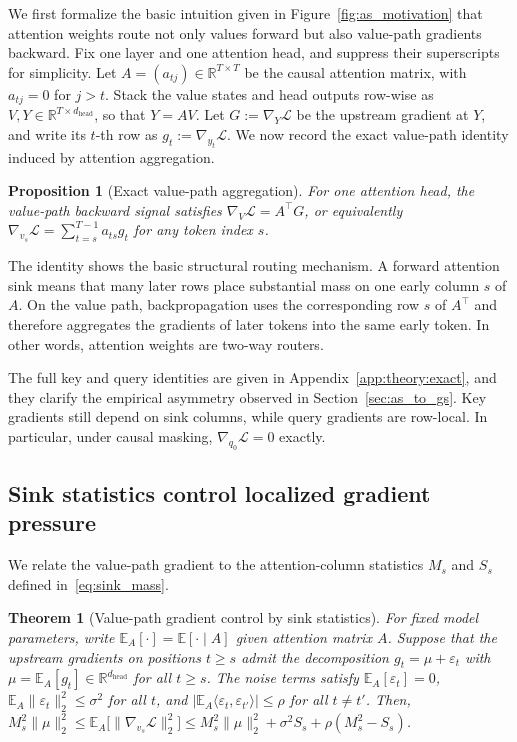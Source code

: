 \documentclass{article}
\theoremstyle{plain}
\newtheorem{theorem}{Theorem}
\newtheorem{proposition}{Proposition}
\theoremstyle{definition}
\theoremstyle{remark}
\begin{document}
We first formalize the basic intuition given in Figure~\ref{fig:as_motivation} that attention weights route not only values forward but also value-path gradients backward. Fix one layer and one attention head, and suppress their superscripts for simplicity. Let $A=(a_{tj})\in\mathbb{R}^{T\times T}$ be the causal attention matrix, with $a_{tj}=0$ for $j>t$. Stack the value states and head outputs row-wise as $V,Y\in\mathbb{R}^{T\times d_{\mathrm{head}}}$, so that $Y=AV$. Let $G:=\nabla_Y\mathcal{L}$ be the upstream gradient at $Y$, and write its $t$-th row as $g_t:=\nabla_{y_t}\mathcal{L}$. We now record the exact value-path identity induced by attention aggregation.

\begin{proposition}[Exact value-path aggregation]\label{prop:v_agg_main}
For one attention head, the value-path backward signal satisfies $\nabla_V \mathcal{L} = A^\top G$, or equivalently $\nabla_{v_s}\mathcal{L} = \sum\nolimits_{t=s}^{T-1} a_{ts} g_t$ for any token index $s$.
\end{proposition}

The identity shows the basic structural routing mechanism. A forward attention sink means that many later rows place substantial mass on one early column $s$ of $A$. On the value path, backpropagation uses the corresponding row $s$ of $A^\top$ and therefore aggregates the gradients of later tokens into the same early token. In other words, attention weights are two-way routers.

The full key and query identities are given in Appendix~\ref{app:theory:exact}, and they clarify the empirical asymmetry observed in Section~\ref{sec:as_to_gs}. Key gradients still depend on sink columns, while query gradients are row-local. In particular, under causal masking, $\nabla_{q_0}\mathcal{L}=0$ exactly.

\subsection{Sink statistics control localized gradient pressure}

We relate the value-path gradient to the attention-column statistics $M_s$ and $S_s$ defined in~\eqref{eq:sink_mass}.

\begin{theorem}[Value-path gradient control by sink statistics]\label{thm:v_second_moment_main}
For fixed model parameters, write $\mathbb E_A[\cdot]=\mathbb E[\cdot\mid A]$ given attention matrix $A$. Suppose that the upstream gradients on positions $t\ge s$ admit the decomposition $g_t=\mu+\varepsilon_t$ with $\mu=\mathbb{E}_A[g_t]\in\mathbb{R}^{d_{\mathrm{head}}}$ for all $t\ge s$. The noise terms satisfy $\mathbb{E}_A[\varepsilon_t]=0$, $\mathbb E_A\|\varepsilon_t\|_2^2\le\sigma^2$ for all $t$, and $|\mathbb E_A\langle\varepsilon_t,\varepsilon_{t'}\rangle|
\le\rho$ for all $t\ne t'$.
Then,
$M_s^2\|\mu\|_2^2
\le
\mathbb{E}_A\big[\|\nabla_{v_s}\mathcal{L}\|_2^2\big]
\le
M_s^2\|\mu\|_2^2 + \sigma^2 S_s + \rho(M_s^2 - S_s)$.
\end{theorem}
\end{document}
